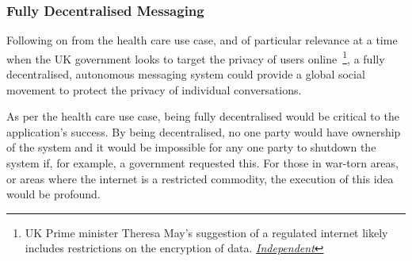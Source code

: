 \subsubsection{Fully Decentralised Messaging}

Following on from the health care use case, and of particular relevance at a time when the UK government looks to target the privacy of users online~\footnote{UK Prime minister Theresa May's suggestion of a regulated internet likely includes restrictions on the encryption of data. \href{http://www.independent.co.uk/life-style/gadgets-and-tech/news/theresa-may-internet-conservatives-government-a7744176.html}{\textit{Independent}}}, a fully decentralised, autonomous messaging system could provide a global social movement to protect the privacy of individual conversations.

As per the health care use case, being fully decentralised would be critical to the application's success. By being decentralised, no one party would have ownership of the system and it would be impossible for any one party to shutdown the system if, for example, a government requested this. For those in war-torn areas, or areas where the internet is a restricted commodity, the execution of this idea would be profound.
